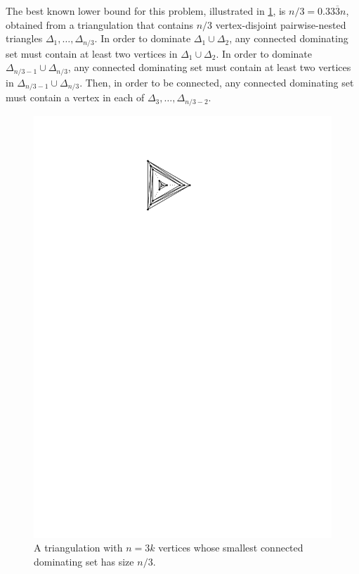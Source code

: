 \documentclass{article}
\theoremstyle{definition}
\begin{document}
The best known lower bound for this problem, illustrated in \cref{lower_bound}, is $n/3 = 0.33\overline{3} n$, obtained from a triangulation that contains $n/3$ vertex-disjoint pairwise-nested triangles $\Delta_1,\ldots,\Delta_{n/3}$.  In order to dominate $\Delta_1\cup \Delta_2$, any connected dominating set must contain at least two vertices in $\Delta_1 \cup \Delta_2$. In order to dominate $\Delta_{n/3-1}\cup \Delta_{n/3}$, any connected dominating set must contain at least two vertices in $\Delta_{n/3-1}\cup\Delta_{n/3}$.  Then, in order to be connected, any connected dominating set must contain a vertex in each of $\Delta_3,\ldots,\Delta_{n/3-2}$.

\begin{figure}[htbp]
  \centering
  \includegraphics{figs/nover3}
  \caption{A triangulation with $n=3k$ vertices whose smallest connected dominating set has size $n/3$.}
  \label{lower_bound}
\end{figure}
\end{document}
